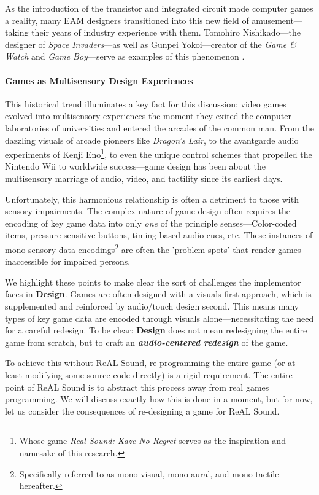 \documentclass{report}
\newcommand{\rs}{ReAL Sound\xspace}
\newcommand{\design}{\textbf{Design}\xspace}
\newcommand{\imp}{implementor\xspace}
\begin{document}
As the introduction of the transistor and integrated circuit made computer games a reality, many EAM designers transitioned into this new field of amusement---taking their years of industry experience with them. Tomohiro Nishikado---the designer of \emph{Space Invaders}---as well as Gunpei Yokoi---creator of the \emph{Game \& Watch} and \emph{Game Boy}---serve as examples of this phenomenon \cite{theycreateworlds}.

\paragraph{Games as Multisensory Design Experiences}

This historical trend illuminates a key fact for this discussion: video games evolved into multisensory experiences the moment they exited the computer laboratories of universities and entered the arcades of the common man. From the dazzling visuals of arcade pioneers like \emph{Dragon's Lair}, to the avantgarde audio experiments of Kenji Eno\footnote{Whose game \emph{Real Sound: Kaze No Regret} serves as the inspiration and namesake of this research.}, to even the unique control schemes that propelled the Nintendo Wii to worldwide success---game design has been about the multisensory marriage of audio, video, and tactility since its earliest days.

Unfortunately, this harmonious relationship is often a detriment to those with sensory impairments. The complex nature of game design often requires the encoding of key game data into only \emph{one} of the principle senses---Color-coded items, pressure sensitive buttons, timing-based audio cues, etc. These instances of mono-sensory data encodings\footnote{Specifically referred to as mono-visual, mono-aural, and mono-tactile hereafter.} are often the 'problem spots' that render games inaccessible for impaired persons.


We highlight these points to make clear the sort of challenges the \imp faces in \design. Games are often designed with a visuals-first approach, which is supplemented and reinforced by audio/touch design second. This means many types of key game data are encoded through visuals alone---necessitating the need for a careful redesign. To be clear: \design does not mean redesigning the entire game from scratch, but to craft an \emph{\textbf{audio-centered redesign}} of the game.

To achieve this without \rs, re-programming the entire game (or at least modifying some source code directly) is a rigid requirement. The entire point of \rs is to abstract this process away from real games programming. We will discuss exactly how this is done in a moment, but for now, let us consider the consequences of re-designing a game for \rs. 
\end{document}
